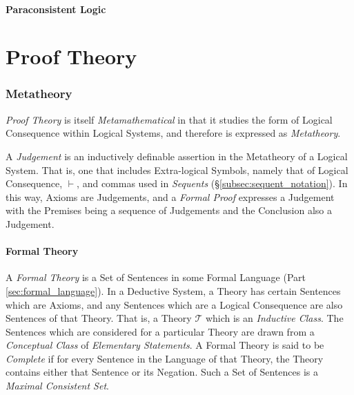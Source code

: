 \documentclass{article}
\begin{document}
\subsection{Paraconsistent Logic}



\part{Proof Theory}\label{sec:proof_theory}

\section{Metatheory} \label{sec:metatheory}

\emph{Proof Theory} is itself \emph{Metamathematical} in that it
studies the form of Logical Consequence within Logical Systems, and
therefore is expressed as \emph{Metatheory}.

A \emph{Judgement} is an inductively definable assertion in the
Metatheory of a Logical System. That is, one that includes
Extra-logical Symbols, namely that of Logical Consequence, $\vdash$,
and commas used in \emph{Sequents}
(\S\ref{subsec:sequent_notation}). In this way, Axioms are Judgements,
and a \emph{Formal Proof} expresses a Judgement with the Premises
being a sequence of Judgements and the Conclusion also a Judgement.

\subsection{Formal Theory}\label{subsec:formal_theory}

A \emph{Formal Theory} is a Set of Sentences in some Formal Language
(Part \ref{sec:formal_language}). In a Deductive System, a Theory has
certain Sentences which are Axioms, and any Sentences which are a
Logical Consequence are also Sentences of that Theory. That is, a
Theory $\mathcal{T}$ which is an \emph{Inductive Class}. The Sentences
which are considered for a particular Theory are drawn from a
\emph{Conceptual Class} of \emph{Elementary Statements}. A Formal
Theory is said to be \emph{Complete} if for every Sentence in the
Language of that Theory, the Theory contains either that Sentence or
its Negation. Such a Set of Sentences is a \emph{Maximal Consistent
  Set}.
\end{document}
